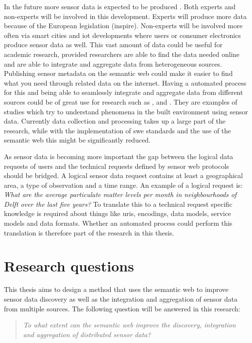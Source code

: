 In the future more sensor data is expected to be produced \citep{IoT:PWC}. Both experts and non-experts will be involved in this development. Experts will produce more data because of the European legislation (\ac{inspire}). Non-experts will be involved more often via smart cities and \ac{iot} developments where users or consumer electronics produce sensor data as well. This vast amount of data could be useful for academic research, provided researchers are able to find the data needed online and are able to integrate and aggregate data from heterogeneous sources. Publishing sensor metadata on the semantic web could make it easier to find what you need through related data on the internet. Having a automated process for this and being able to seamlessly integrate and aggregate data from different sources could be of great use for research such as \cite{UC:vanderHoeven}, \cite{UC:Hotterdam} and \cite{UC:Theunisse}. They are examples of studies which try to understand phenomena in the built environment using sensor data. Currently data collection and processing takes up a large part of the research, while with the implementation of \ac{swe} standards and the use of the semantic web this might be significantly reduced.  

As sensor data is becoming more important the gap between the logical data requests of users and the technical requests defined by sensor web protocols should be bridged. A logical sensor data request contains at least a geographical area, a type of observation and a time range. An example of a logical request is: \textit{What are the average particulate matter levels per month in neighbourhoods of Delft over the last five years?} To translate this to a technical request specific knowledge is required about things like \acp{uri}, encodings, data models, service models and data formats. Whether an automated process could perform this translation is therefore part of the research in this thesis. 


\section{Research questions}
This thesis aims to design a method that uses the semantic web to improve sensor data discovery as well as the integration and aggregation of sensor data from multiple sources. The following question will be answered in this research:    

\begin{quote}
	\textit{To what extent can the semantic web improve the discovery, integration and aggregation of distributed sensor data?}
\end{quote}

